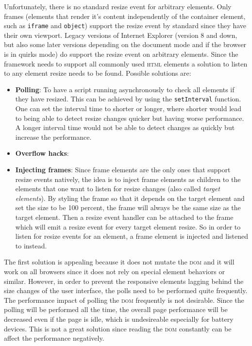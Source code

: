 \documentclass[a4paper,11pt]{kth-mag}
\newcommand{\code}[1]{\texttt{#1}}
\begin{document}
          Unfortunately, there is no standard resize event for arbitrary elements.
          Only frames (elements that render it's content independently of the container element, such as \code{iframe} and \code{object}) support the resize event by standard since they have their own viewport.
          Legacy versions of Internet Explorer (version 8 and down, but also some later versions depending on the document mode and if the browser is in quirks mode) do support the resize event on arbitrary elements.
          Since the framework needs to support all commonly used \textsc{html} elements a solution to listen to any element resize needs to be found.
          Possible solutions are:
          \begin{itemize}
            \item \textbf{Polling}:
              To have a script running asynchronously to check all elements if they have resized.
              This can be achieved by using the \code{setInterval} function.
              One can set the interval time to shorter or longer, where shorter would lead to being able to detect resize changes quicker but having worse performance.
              A longer interval time would not be able to detect changes as quickly but increase the performance.
            \item \textbf{Overflow hacks}:
            \item \textbf{Injecting frames}:
              Since frame elements are the only ones that support resize events natively, the idea is to inject frame elements as children to the elements that one want to listen for resize changes (also called \emph{target elements}).
              By styling the frame so that it depends on the target element and set the size to be 100 percent, the frame will always be the same size as the target element.
              Then a resize event handler can be attached to the frame which will emit a resize event for every target element resize.
              So in order to listen for resize events for an element, a frame element is injected and listened to instead.
          \end{itemize}
          The first solution is appealing because it does not mutate the \textsc{dom} and it will work on all browsers since it does not rely on special element behaviors or similar.
          However, in order to prevent the responsive elements lagging behind the size changes of the user interface, the polls need to be performed quite frequently.
          The performance impact of polling the \textsc{dom} frequently is not desirable.
          Since the polling will be performed all the time, the overall page performance will be decreased even if the page is idle, which is undesireable especially for battery devices.
          This is not a great solution since reading the \textsc{dom} constantly can be affect the performance negatively. 
\end{document}
